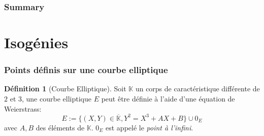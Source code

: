 \documentclass[10pt,a4paper]{beamer}
\theoremstyle{plain}
\theoremstyle{definition}
\theoremstyle{definition}
\theoremstyle{definition}
\theoremstyle{definition}
\newtheorem{defi}[thm]{Définition}
\theoremstyle{remark}
\theoremstyle{remark}
\begin{document}
\begin{frame}
\frametitle{Summary}
\tableofcontents
\end{frame}

\section{Isogénies}

\begin{frame}
\frametitle{Points définis sur une courbe elliptique }

\begin{defi}[Courbe Elliptique]
Soit $\mathbb{K}$ un corps de caractéristique différente de $2$ et $3$, une courbe elliptique $E$ peut être définie à l'aide d'une équation de Weierstrass: 
\begin{equation*}
\label{eq:weierstrass-proj}
E:=\{ (X,Y) \in \overline{\mathbb{K}} , Y^2=X^3+AX+B \} \cup 0_E
\end{equation*}
avec $A,B$ des éléments de $\mathbb{K}$. $0_E$ est appelé le \emph{point à l'infini}. 
\end{defi}

\begin{figure}
\begin{center}

\end{center}
\end{figure}
\end{frame}
\end{document}
